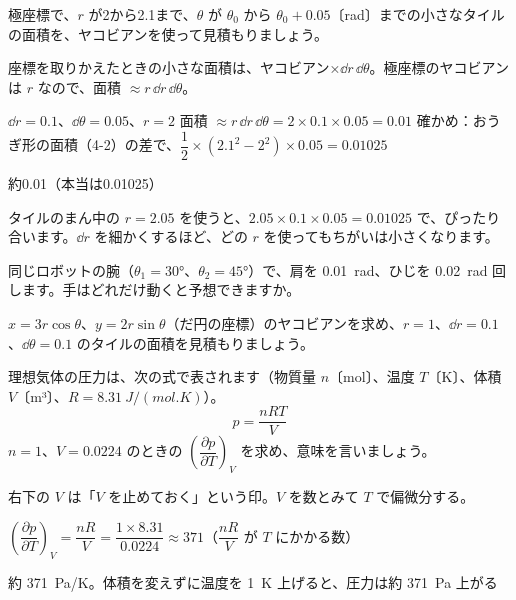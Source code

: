 \begin{reidai}[極座標のタイルの面積]
極座標で、$r$ が2から2.1まで、$\theta$ が $\theta_0$ から $\theta_0+0.05$〔rad〕までの小さなタイルの面積を、ヤコビアンを使って見積もりましょう。\par
\kangaekata 座標を取りかえたときの小さな面積は、ヤコビアン×$\dd r\,\dd\theta$。極座標のヤコビアンは $r$ なので、面積 $\approx r\,\dd r\,\dd\theta$。\par
\shiki $\dd r=0.1$、$\dd\theta=0.05$、$r=2$\kviiidq
面積 $\approx r\,\dd r\,\dd\theta=2\times0.1\times0.05=0.01$\kviiidq
確かめ：おうぎ形の面積（4-2）の差で、$\dfrac{1}{2}\times(2.1^2-2^2)\times0.05=0.01025$\par
\kotae 約0.01（本当は0.01025）
\end{reidai}
\noindent タイルのまん中の $r=2.05$ を使うと、$2.05\times0.1\times0.05=0.01025$ で、ぴったり合います。$\dd r$ を細かくするほど、どの $r$ を使ってもちがいは小さくなります。

\noindent\begin{minipage}[t]{0.49\linewidth}
\begin{jibun}
同じロボットの腕（$\theta_1=30°$、$\theta_2=45°$）で、肩を \qty{0.01}{rad}、ひじを \qty{0.02}{rad} 回します。手はどれだけ動くと予想できますか。
\end{jibun}
\end{minipage}\hfill
\begin{minipage}[t]{0.49\linewidth}
\begin{jibun}
$x=3r\cos\theta$、$y=2r\sin\theta$（だ円の座標）のヤコビアンを求め、$r=1$、$\dd r=0.1$、$\dd\theta=0.1$ のタイルの面積を見積もりましょう。
\end{jibun}
\end{minipage}\par

\begin{reidai}
理想気体の圧力は、次の式で表されます（物質量 $n$〔mol〕、温度 $T$〔K〕、体積 $V$〔m³〕、$R=\qty{8.31}{J/(mol.K)}$）。
\[ p=\frac{nRT}{V} \]
$n=1$、$V=0.0224$ のときの $\left(\dfrac{\partial p}{\partial T}\right)_V$ を求め、意味を言いましょう。\par
\kangaekata 右下の $V$ は「$V$ を止めておく」という印。$V$ を数とみて $T$ で偏微分する。\par
\shiki $\left(\dfrac{\partial p}{\partial T}\right)_V=\dfrac{nR}{V}=\dfrac{1\times8.31}{0.0224}\approx371$（$\dfrac{nR}{V}$ が $T$ にかかる数）\par
\kotae 約 \qty{371}{Pa/K}。体積を変えずに温度を \qty{1}{K} 上げると、圧力は約 \qty{371}{Pa} 上がる
\end{reidai}

